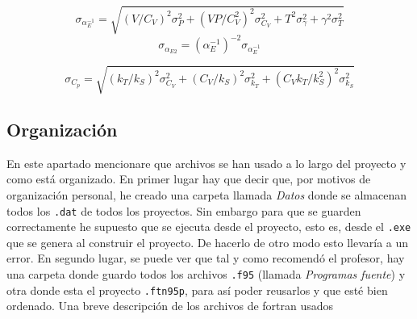 \documentclass[11pt]{article} %
\begin{document}
\begin{equation}
	\sigma_{\alpha_E^{-1}} =\sqrt{(V/C_V)^2\sigma_P^2+(VP/C_V^2)^2 \sigma_{C_V}^2 +T^2  \sigma_{\gamma}^2 + \gamma^2 \sigma_T^2}
\end{equation}
\begin{equation}
\sigma_{\alpha_{E2}} = (\alpha_E^{-1})^{-2} \sigma_{\alpha_E^{-1}}
\end{equation}


\begin{equation}
	\sigma_{C_p} =\sqrt{(k_T/k_S)^2 \sigma_{C_V}^2 + (C_V/k_S)^2 \sigma_{k_T}^2 + (C_Vk_T /k_S^2)^2 \sigma_{k_S}^2}
\end{equation}



\subsection{Organización} \label{Subsec:02}

En este apartado mencionare que archivos se han usado a lo largo del proyecto y como está organizado. En primer lugar hay que decir que, por motivos de organización personal, he creado una carpeta llamada \textit{Datos} donde se almacenan todos los \texttt{.dat} de todos los proyectos. Sin embargo para que se guarden correctamente he supuesto que se ejecuta desde el proyecto, esto es, desde el \texttt{.exe} que se genera al construir el proyecto. De hacerlo de otro modo esto llevaría a un error. En segundo lugar, se puede ver que tal y como recomendó el profesor, hay una carpeta donde guardo todos los archivos \texttt{.f95} (llamada \textit{Programas fuente}) y otra donde esta el proyecto \texttt{.ftn95p}, para así poder reusarlos y que esté bien ordenado. Una breve descripción de los archivos de fortran usados
\end{document}

